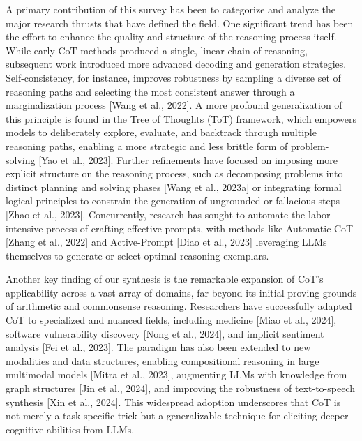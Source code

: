 \documentclass[11pt]{article}
\begin{document}
A primary contribution of this survey has been to categorize and analyze the major research thrusts that have defined the field. One significant trend has been the effort to enhance the quality and structure of the reasoning process itself. While early CoT methods produced a single, linear chain of reasoning, subsequent work introduced more advanced decoding and generation strategies. Self-consistency, for instance, improves robustness by sampling a diverse set of reasoning paths and selecting the most consistent answer through a marginalization process [Wang et al., 2022]. A more profound generalization of this principle is found in the Tree of Thoughts (ToT) framework, which empowers models to deliberately explore, evaluate, and backtrack through multiple reasoning paths, enabling a more strategic and less brittle form of problem-solving [Yao et al., 2023]. Further refinements have focused on imposing more explicit structure on the reasoning process, such as decomposing problems into distinct planning and solving phases [Wang et al., 2023a] or integrating formal logical principles to constrain the generation of ungrounded or fallacious steps [Zhao et al., 2023]. Concurrently, research has sought to automate the labor-intensive process of crafting effective prompts, with methods like Automatic CoT [Zhang et al., 2022] and Active-Prompt [Diao et al., 2023] leveraging LLMs themselves to generate or select optimal reasoning exemplars.

Another key finding of our synthesis is the remarkable expansion of CoT's applicability across a vast array of domains, far beyond its initial proving grounds of arithmetic and commonsense reasoning. Researchers have successfully adapted CoT to specialized and nuanced fields, including medicine [Miao et al., 2024], software vulnerability discovery [Nong et al., 2024], and implicit sentiment analysis [Fei et al., 2023]. The paradigm has also been extended to new modalities and data structures, enabling compositional reasoning in large multimodal models [Mitra et al., 2023], augmenting LLMs with knowledge from graph structures [Jin et al., 2024], and improving the robustness of text-to-speech synthesis [Xin et al., 2024]. This widespread adoption underscores that CoT is not merely a task-specific trick but a generalizable technique for eliciting deeper cognitive abilities from LLMs.
\end{document}
